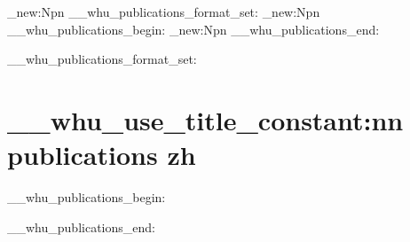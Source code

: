 

\cs_new:Npn \__whu_publications_format_set: { }
\cs_new:Npn \__whu_publications_begin: { }
\cs_new:Npn \__whu_publications_end: { }
 {}
  {
    \__whu_publications_format_set:
    \chapter
      [
        \__whu_use_title_constant:nn { publications } { zh-toc }
      ]
      {
        \__whu_use_title_constant:nn { publications } { zh }
      }
    \__whu_publications_begin:
  }
  { 
    \__whu_publications_end:
  }